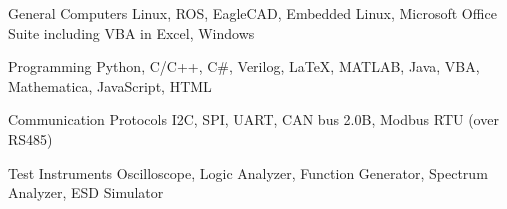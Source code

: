 

\begin{cvskills}

  \cvskill
    {General Computers} %
    {Linux, ROS, EagleCAD, Embedded Linux, Microsoft Office Suite including VBA in Excel, Windows} %

  \cvskill
    {Programming} %
    {Python, C/C++, C\#, Verilog, LaTeX, MATLAB, Java, VBA, Mathematica, JavaScript, HTML} %

  \cvskill
    {Communication Protocols} %
    {I2C, SPI, UART, CAN bus 2.0B, Modbus RTU (over RS485)} %

  \cvskill
    {Test Instruments} %
    {Oscilloscope, Logic Analyzer, Function Generator, Spectrum Analyzer, ESD Simulator} %

\end{cvskills}
